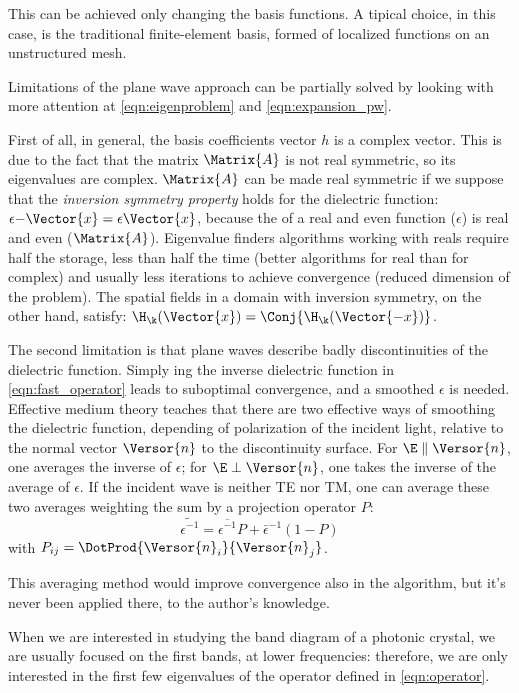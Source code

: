 This can be achieved only changing the basis functions. A tipical
choice, in this case, is the traditional finite-element basis, formed
of localized functions on an unstructured mesh.

Limitations of the plane wave approach can be partially solved by
looking with more attention at \ref{eqn:eigenproblem} and
\ref{eqn:expansion_pw}.

First of all, in general, the basis coefficients vector $h$ is a
complex vector. This is due to the fact that the matrix $\Matrix{A}$
is not real symmetric, so its eigenvalues are complex. $\Matrix{A}$
can be made real symmetric if we suppose that the \emph{inversion
symmetry property} holds for the dielectric function:
$\epsilon{-\Vector{x}} = \epsilon{\Vector{x}}$, because the 
of a real and even function ($\epsilon$) is real and even
($\Matrix{A}$). Eigenvalue finders algorithms working with reals
require half the storage, less than half the time (better algorithms
for real than for complex) and usually less iterations to achieve
convergence (reduced dimension of the problem). The spatial fields in
a domain with inversion symmetry, on the other hand, satisfy:
$\H_{\k}(\Vector{x}) = \Conj{\H_{\k}(\Vector{-x})}$.

The second limitation is that plane waves describe badly
discontinuities of the dielectric function. Simply ing the
inverse dielectric function in \ref{eqn:fast_operator} leads to
suboptimal convergence, and a smoothed $\epsilon$ is needed. Effective
medium theory teaches that there are two effective ways of smoothing
the dielectric function, depending of polarization of the incident
light, relative to the normal vector $\Versor{n}$ to the discontinuity
surface. For $\E \parallel \Versor{n}$, one averages the inverse of
$\epsilon$; for $\E \perp \Versor{n}$, one takes the inverse of the
average of $\epsilon$. If the incident wave is neither TE nor TM, one
can average these two averages weighting the sum by a projection
operator $P$:
\begin{equation} \label{eqn:epsilon_averaging}
  \widetilde{\epsilon^{-1}} = \overline{\epsilon^{-1}} P +
  \bar{\epsilon}^{-1} (1-P)
\end{equation}
with $P_{ij} = \DotProd{\Versor{n}_i}{\Versor{n}_j}$.

This averaging method would improve convergence also in the
 algorithm, but it's never been applied there, to the
author's knowledge.

When we are interested in studying the band diagram of
a photonic crystal, we are usually focused on the first bands, at
lower frequencies: therefore, we are only interested in the
first few eigenvalues of the operator defined in \ref{eqn:operator}.


